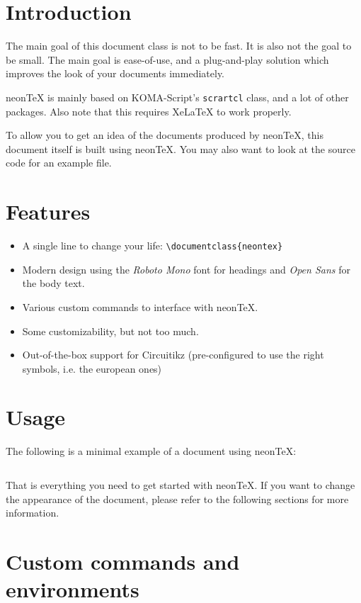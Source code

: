 \documentclass{neontex}
\begin{document}
	\maketitle
	\tableofcontents

	\section{Introduction}

	The main goal of this document class is not to be fast. It is also not the goal to be small. The main goal is ease-of-use, and a plug-and-play solution which improves the look of your documents immediately.

	neonTeX is mainly based on KOMA-Script's \texttt{scrartcl} class, and a lot of other packages. Also note that this requires XeLaTeX to work properly.

	To allow you to get an idea of the documents produced by neonTeX, this document itself is built using neonTeX. You may also want to look at the source code for an example file.

	\section{Features}
	\begin{itemize}
		\item A single line to change your life: \texttt{\textbackslash documentclass\{neontex\}}
		\item Modern design using the \textit{Roboto Mono} font for headings and \textit{Open Sans} for the body text.
		\item Various custom commands to interface with neonTeX.
		\item Some customizability, but not too much.
		\item Out-of-the-box support for Circuitikz (pre-configured to use the right symbols, i.e. the european ones)
	\end{itemize}

	\section{Usage}
	The following is a minimal example of a document using neonTeX:
	\inputminted{latex}{usage.tex}
	That is everything you need to get started with neonTeX. If you want to change the appearance of the document, please refer to the following sections for more information.

	\section{Custom commands and environments}
\end{document}
